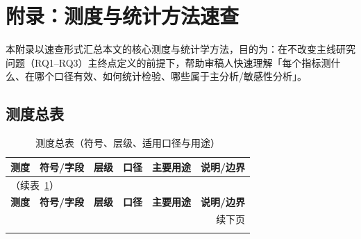 \section{附录：测度与统计方法速查}\label{app:metrics-stats-cheatsheet}

本附录以速查形式汇总本文的核心测度与统计学方法，目的为：在不改变主线研究问题（RQ1--RQ3）主终点定义的前提下，帮助审稿人快速理解「每个指标测什么、在哪个口径有效、如何统计检验、哪些属于主分析/敏感性分析」。

\subsection{测度总表}

\small
\begin{longtable}{p{3cm} p{2.5cm} p{2cm} p{1.5cm} p{3cm} p{3.5cm}}
\caption{测度总表（符号、层级、适用口径与用途）}\label{tab:metrics-overview}\\
\toprule
\textbf{测度} & \textbf{符号/字段} & \textbf{层级} & \textbf{口径} & \textbf{主要用途} & \textbf{说明/边界}
\\
\midrule
\endfirsthead

\multicolumn{6}{l}{\small（续表~\ref{tab:metrics-overview}）}\\
\toprule
\textbf{测度} & \textbf{符号/字段} & \textbf{层级} & \textbf{口径} & \textbf{主要用途} & \textbf{说明/边界}
\\
\midrule
\endhead

\midrule
\multicolumn{6}{r}{\small 续下页}\\
\endfoot

\bottomrule
\endlastfoot


\end{longtable}
